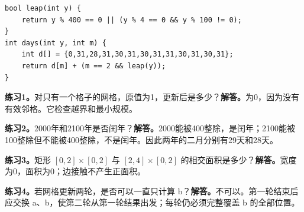 \begin{lstlisting}
bool leap(int y) {
    return y % 400 == 0 || (y % 4 == 0 && y % 100 != 0);
}
int days(int y, int m) {
    int d[] = {0,31,28,31,30,31,30,31,31,30,31,30,31};
    return d[m] + (m == 2 && leap(y));
}
\end{lstlisting}

\exercise
\textbf{练习1。}对只有一个格子的网格，原值为1，更新后是多少？\textbf{解答。}为0，因为没有有效邻格。它检查越界和最小规模。

\textbf{练习2。}2000年和2100年是否闰年？\textbf{解答。}2000能被400整除，是闰年；2100能被100整除但不能被400整除，不是闰年。因此两年的二月分别有29天和28天。

\textbf{练习3。}矩形 $[0,2]\times[0,2]$ 与 $[2,4]\times[0,2]$ 的相交面积是多少？\textbf{解答。}宽度为0，面积为0；边接触不产生正面积。

\textbf{练习4。}若网格更新两轮，是否可以一直只计算 b？\textbf{解答。}不可以。第一轮结束后应交换 a、b，使第二轮从第一轮结果出发；每轮仍必须完整覆盖 b 的全部位置。
\newpage
